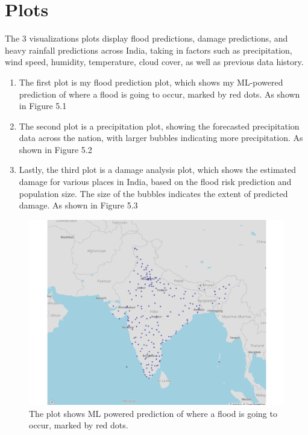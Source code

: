 \documentclass[a4paper,12pt]{report}
\begin{document}
\section{Plots}

The 3 visualizations plots display flood predictions, damage predictions, and heavy rainfall predictions across India, taking in factors such as precipitation, wind speed, humidity, temperature, cloud cover, as well as previous data history.

\begin{enumerate}
    \item The first plot is my flood prediction plot, which shows my ML-powered prediction of where a flood is going to occur, marked by red dots. As shown in Figure 5.1
    \item The second plot is a precipitation plot, showing the forecasted precipitation data across the nation, with larger bubbles indicating more precipitation. As shown in Figure 5.2
    \item Lastly, the third plot is a damage analysis plot, which shows the estimated damage for various places in India, based on the flood risk prediction and population size. The size of the bubbles indicates the extent of predicted damage. As shown in Figure 5.3
\end{enumerate}


\begin{figure}[ht]
  \centering
  \includegraphics[width=\linewidth]{plot1.png}
  \caption{The plot shows ML powered prediction of where a flood is going to occur, marked by red dots.}
\end{figure}
\end{document}
